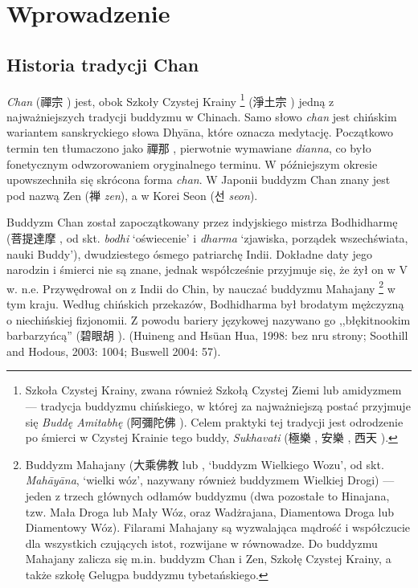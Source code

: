 \maketitle
\section{Wprowadzenie}
\subsection{Historia tradycji Chan}
\emph{Chan} (禪宗 ) jest, obok Szkoły Czystej Krainy%
\footnote{Szkoła Czystej Krainy, zwana również Szkołą Czystej Ziemi lub amidyzmem --- tradycja buddyzmu chińskiego, w której za najważniejszą postać przyjmuje się \emph{Buddę Amitabhę} (阿彌陀佛 ). Celem praktyki tej tradycji jest odrodzenie po śmierci w Czystej Krainie tego buddy, \emph{Sukhavati} (極樂 , 安樂 , 西天 ).}
(淨土宗 ) jedną z najważniejszych tradycji buddyzmu w Chinach. Samo słowo \emph{chan} jest chińskim wariantem %
sanskryckiego słowa Dhyāna, które oznacza medytację. %
Początkowo termin ten tłumaczono jako 禪那 , pierwotnie wymawiane \emph{dianna}, co było fonetycznym odwzorowaniem oryginalnego terminu. W późniejszym okresie upowszechniła się skrócona forma \emph{chan}. W Japonii buddyzm Chan znany jest pod nazwą Zen (禅 \emph{zen}), a w Korei Seon ({\Hangul 선} \emph{seon}).

Buddyzm Chan został zapoczątkowany przez indyjskiego mistrza Bodhidharmę (菩提達摩 , od skt. \emph{bodhi} `oświecenie' i \emph{dharma} `zjawiska, porządek wszechświata, nauki Buddy'), dwudziestego ósmego patriarchę Indii. Dokładne daty jego narodzin i śmierci nie są znane, jednak współcześnie przyjmuje się, że żył on w V w. n.e. Przywędrował on z Indii do Chin, by nauczać buddyzmu Mahajany
\footnote{Buddyzm Mahajany (大乘佛教  lub , `buddyzm Wielkiego Wozu', od skt. \emph{Mahāyāna}, `wielki wóz', nazywany również buddyzmem Wielkiej Drogi) --- jeden z trzech głównych odłamów buddyzmu (dwa pozostałe to Hinajana, tzw. Mała Droga lub Mały Wóz, oraz Wadżrajana, Diamentowa Droga lub Diamentowy Wóz). Filarami Mahajany są wyzwalająca mądrość i współczucie dla wszystkich czujących istot, rozwijane w równowadze. Do buddyzmu Mahajany zalicza się m.in. buddyzm Chan i Zen, Szkołę Czystej Krainy, a także szkołę Gelugpa buddyzmu tybetańskiego.}
w tym kraju. Według chińskich przekazów, Bodhidharma był brodatym mężczyzną o niechińskiej fizjonomii. Z powodu bariery językowej nazywano go ,,błękitnookim barbarzyńcą'' (碧眼胡 ). (Huineng and Hsüan Hua, 1998: bez nru strony; Soothill and Hodous, 2003: 1004; Buswell 2004: 57).

